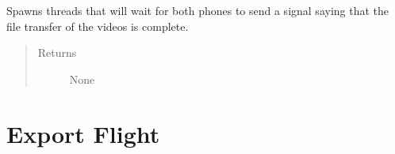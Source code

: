 \documentclass[letterpaper,10pt,english]{sphinxmanual}
\begin{document}
\begin{fulllineitems}
\begin{fulllineitems}
\label{\detokenize{index:src.Controllers.PhoneController.PhoneControl.waitForFileTransfer}}
Spawns threads that will wait for both phones to send a signal saying that the file transfer
of the videos is complete.
\begin{quote}\begin{description}
\item[{Returns}] \leavevmode
None

\end{description}\end{quote}

\end{fulllineitems}


\end{fulllineitems}



\chapter{Export Flight}
\label{\detokenize{index:module-src.Export.ExportFile}}\label{\detokenize{index:export-flight}}
\end{document}
